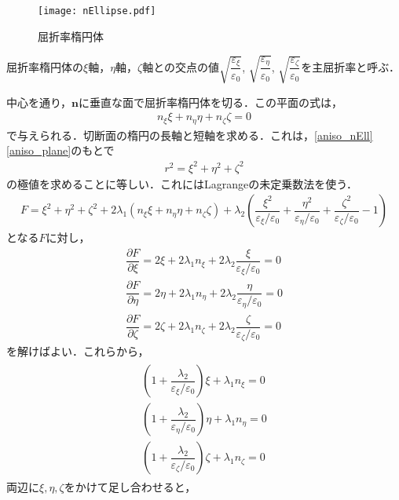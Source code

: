 \begin{figure}[ht]
  \centering
  \texttt{[image: nEllipse.pdf]}
  \caption{屈折率楕円体}
  \label{nEllipse}
\end{figure}

屈折率楕円体の$\xi$軸，$\eta$軸，$\zeta$軸との交点の値$\sqrt{\dfrac{\varepsilon_\xi}{\varepsilon_0}}$, $\sqrt{\dfrac{\varepsilon_\eta}{\varepsilon_0}}$, $\sqrt{\dfrac{\varepsilon_\zeta}{\varepsilon_0}}$を主屈折率と呼ぶ．

中心を通り，$\boldsymbol{n}$に垂直な面で屈折率楕円体を切る．この平面の式は，
\begin{align}
  n_\xi\xi+n_\eta\eta+n_\zeta\zeta=0\label{aniso_plane}
\end{align}
で与えられる．切断面の楕円の長軸と短軸を求める．これは，\eqref{aniso_nEll}\eqref{aniso_plane}のもとで
\begin{align}
  r^2=\xi^2+\eta^2+\zeta^2
\end{align}
の極値を求めることに等しい．これにはLagrangeの未定乗数法を使う．
\begin{align}
  F=\xi^2+\eta^2+\zeta^2+2\lambda_1\left(n_\xi\xi+n_\eta\eta+n_\zeta\zeta\right)+\lambda_2\left(\dfrac{\xi^2}{\varepsilon_\xi/\varepsilon_0}+\dfrac{\eta^2}{\varepsilon_\eta/\varepsilon_0}+\dfrac{\zeta^2}{\varepsilon_\zeta/\varepsilon_0}-1\right)
\end{align}
となる$F$に対し，
\begin{align*}
  \dfrac{\partial{F}}{\partial\xi}=2\xi+2\lambda_1n_\xi+2\lambda_2\dfrac{\xi}{\varepsilon_\xi/\varepsilon_0}=0\\
  \dfrac{\partial{F}}{\partial\eta}=2\eta+2\lambda_1n_\eta+2\lambda_2\dfrac{\eta}{\varepsilon_\eta/\varepsilon_0}=0\\
  \dfrac{\partial{F}}{\partial\zeta}=2\zeta+2\lambda_1n_\zeta+2\lambda_2\dfrac{\zeta}{\varepsilon_\zeta/\varepsilon_0}=0
\end{align*}
を解けばよい．これらから，
\begin{align}
  \begin{split}
    \left(1+\dfrac{\lambda_2}{\varepsilon_\xi/\varepsilon_0}\right)\xi+\lambda_1n_\xi=0\\
    \left(1+\dfrac{\lambda_2}{\varepsilon_\eta/\varepsilon_0}\right)\eta+\lambda_1n_\eta=0\\
    \left(1+\dfrac{\lambda_2}{\varepsilon_\zeta/\varepsilon_0}\right)\zeta+\lambda_1n_\zeta=0
  \end{split}
  \label{aniso_lag1}
\end{align}
両辺に$\xi,\eta,\zeta$をかけて足し合わせると，
